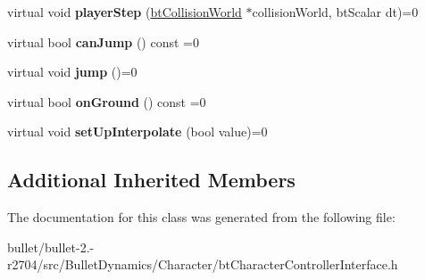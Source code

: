 \begin{DoxyCompactItemize}
\item 
\hypertarget{classbt_character_controller_interface_a36747974481cc6395c7dcab9b1f10330}{virtual void {\bfseries player\+Step} (\hyperlink{classbt_collision_world}{bt\+Collision\+World} $\ast$collision\+World, bt\+Scalar dt)=0}\label{classbt_character_controller_interface_a36747974481cc6395c7dcab9b1f10330}

\item 
\hypertarget{classbt_character_controller_interface_a40dbb6ac95ab3ff167f90274a1315d32}{virtual bool {\bfseries can\+Jump} () const =0}\label{classbt_character_controller_interface_a40dbb6ac95ab3ff167f90274a1315d32}

\item 
\hypertarget{classbt_character_controller_interface_a639aa33df3cbb175e7053b64206027ab}{virtual void {\bfseries jump} ()=0}\label{classbt_character_controller_interface_a639aa33df3cbb175e7053b64206027ab}

\item 
\hypertarget{classbt_character_controller_interface_a943e28cae25e3731a5e0145173ecc8a2}{virtual bool {\bfseries on\+Ground} () const =0}\label{classbt_character_controller_interface_a943e28cae25e3731a5e0145173ecc8a2}

\item 
\hypertarget{classbt_character_controller_interface_a6670c16b38f52a80c03f4a3ebb476699}{virtual void {\bfseries set\+Up\+Interpolate} (bool value)=0}\label{classbt_character_controller_interface_a6670c16b38f52a80c03f4a3ebb476699}

\end{DoxyCompactItemize}
\subsection*{Additional Inherited Members}


The documentation for this class was generated from the following file\+:\begin{DoxyCompactItemize}
\item 
bullet/bullet-\/2.-\/r2704/src/\+Bullet\+Dynamics/\+Character/bt\+Character\+Controller\+Interface.\+h\end{DoxyCompactItemize}
